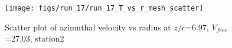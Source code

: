 \begin{figure}[H]
\centering
\texttt{[image: figs/run\_17/run\_17\_T\_vs\_r\_mesh\_scatter]}
\caption{Scatter plot of azimuthal velocity vs radius at $z/c$=6.97, $V_{free}$=27.03, station2}
\label{fig:run_17_T_vs_r_mesh_scatter}
\end{figure}


